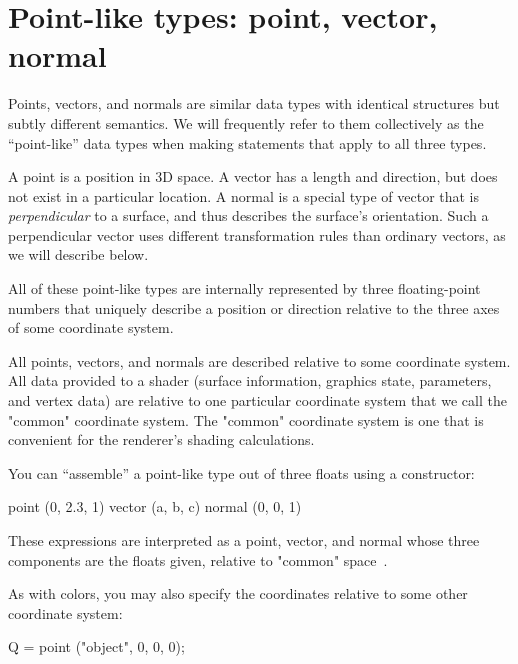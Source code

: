 \documentclass[11pt,letterpaper]{book}
\def\normal{{\cf normal}\xspace}
\def\point{{\cf point}\xspace}
\def\vector{{\cf vector}\xspace}
\def\commonspace{{\cf "common"} space\xspace}
\begin{document}
\section{Point-like types: {\cf point}, {\cf vector}, {\cf normal}}
\label{sec:types:point}
  
  

Points, vectors, and normals are similar data types with identical
structures but subtly different semantics.  We will frequently refer to
them collectively as the ``point-like'' data types when making
statements that apply to all three types.

A \point is a position in 3D space.  A \vector has a length and
direction, but does not exist in a particular location.  A \normal is a
special type of vector that is \emph{perpendicular} to a surface, and
thus describes the surface's orientation.  Such a perpendicular vector
uses different transformation rules than ordinary vectors, as we will
describe below.

All of these point-like types are internally represented by three
floating-point numbers that uniquely describe a position or
direction relative to the three axes of some coordinate system.  

All points, vectors, and normals are described relative to some
coordinate system.  All data provided to a shader (surface information,
graphics state, parameters, and vertex data) are relative to one
particular coordinate system that we call the {\cf "common"} coordinate
system.  The {\cf "common"} coordinate system is one that is convenient
for the renderer's shading calculations.
\label{sect:commonspace}

You can ``assemble'' a point-like type out of three floats using a
constructor:

\begin{code}
        point (0, 2.3, 1)
        vector (a, b, c)
        normal (0, 0, 1)
\end{code}

\noindent These expressions are interpreted as a point, vector, and normal
whose three components are the floats given, relative to \commonspace\ .

As with colors, you may also specify the coordinates relative to some other
coordinate system:

\begin{code}
    Q = point ("object", 0, 0, 0);
\end{code}
\end{document}

